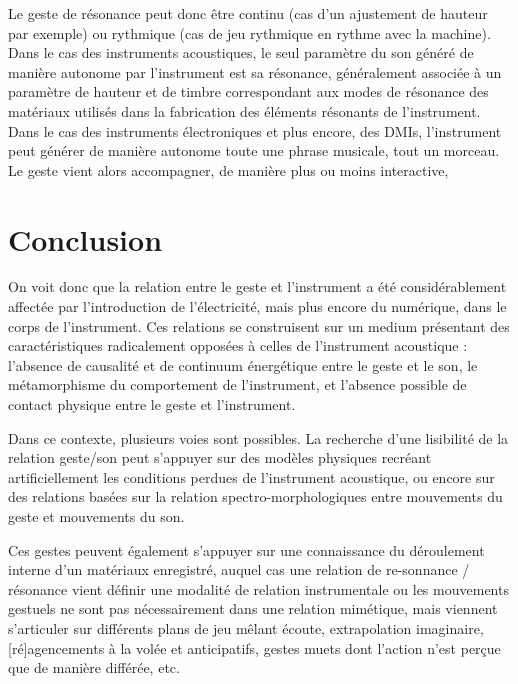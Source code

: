 Le geste de résonance peut donc être continu (cas d'un ajustement de hauteur par exemple) ou rythmique (cas de jeu rythmique en rythme avec la machine).
Dans le cas des instruments acoustiques, le seul paramètre du son généré de manière autonome par l'instrument est sa résonance, généralement associée à un paramètre de hauteur et de timbre correspondant aux modes de résonance des matériaux utilisés dans la fabrication des éléments résonants de l'instrument. Dans le cas des instruments électroniques et plus encore, des \glspl{DMI}, l'instrument peut générer de manière autonome toute une phrase musicale, tout un morceau. Le geste vient alors accompagner, de manière plus ou moins interactive, 




 
\section{Conclusion}
\label{sec:gesture:conclusion}


\noindent On voit donc que la relation entre le geste et l'instrument a été considérablement affectée par l'introduction de l'électricité, mais plus encore du numérique, dans le corps de l'instrument. Ces relations se construisent sur un medium présentant des caractéristiques radicalement opposées à celles de l'instrument acoustique : l'absence de causalité et de continuum énergétique entre le geste et le son, le métamorphisme du comportement de l'instrument, et l'absence possible de contact physique entre le geste et l'instrument.

Dans ce contexte, plusieurs voies sont possibles. 
La recherche d'une lisibilité de la relation geste/son peut s'appuyer sur des modèles physiques recréant artificiellement les conditions perdues de l'instrument acoustique, ou encore sur des relations basées sur la relation spectro-morphologiques entre mouvements du geste et mouvements du son.

Ces gestes peuvent également s'appuyer sur une connaissance du déroulement interne d'un matériaux enregistré, auquel cas une relation de re-sonnance / résonance vient définir une modalité de relation instrumentale ou les mouvements gestuels ne sont pas nécessairement dans une relation mimétique, mais viennent s'articuler sur différents plans de jeu mêlant écoute, extrapolation imaginaire, [ré]agencements à la volée et anticipatifs, gestes muets dont l'action n'est perçue que de manière différée, etc.




